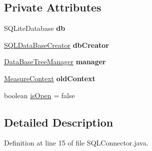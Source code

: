 \subsection*{Private Attributes}
\begin{DoxyCompactItemize}
\item 
\hypertarget{classcom_1_1qualoutdoor_1_1recorder_1_1persistent_1_1SQLConnector_aa90e660df93d5e81f841238868167bce}{S\-Q\-Lite\-Database {\bfseries db}}\label{classcom_1_1qualoutdoor_1_1recorder_1_1persistent_1_1SQLConnector_aa90e660df93d5e81f841238868167bce}

\item 
\hypertarget{classcom_1_1qualoutdoor_1_1recorder_1_1persistent_1_1SQLConnector_a78e2cb330cd0ce6e7d3b7805d1b50a01}{\hyperlink{classcom_1_1qualoutdoor_1_1recorder_1_1persistent_1_1SQLDataBaseCreator}{S\-Q\-L\-Data\-Base\-Creator} {\bfseries db\-Creator}}\label{classcom_1_1qualoutdoor_1_1recorder_1_1persistent_1_1SQLConnector_a78e2cb330cd0ce6e7d3b7805d1b50a01}

\item 
\hypertarget{classcom_1_1qualoutdoor_1_1recorder_1_1persistent_1_1SQLConnector_ab31ffde14c01c1fb07bc70adc02db978}{\hyperlink{classcom_1_1qualoutdoor_1_1recorder_1_1persistent_1_1DataBaseTreeManager}{Data\-Base\-Tree\-Manager} {\bfseries manager}}\label{classcom_1_1qualoutdoor_1_1recorder_1_1persistent_1_1SQLConnector_ab31ffde14c01c1fb07bc70adc02db978}

\item 
\hypertarget{classcom_1_1qualoutdoor_1_1recorder_1_1persistent_1_1SQLConnector_a992026f34b676a92c8604d33cea1c21c}{\hyperlink{classcom_1_1qualoutdoor_1_1recorder_1_1persistent_1_1MeasureContext}{Measure\-Context} {\bfseries old\-Context}}\label{classcom_1_1qualoutdoor_1_1recorder_1_1persistent_1_1SQLConnector_a992026f34b676a92c8604d33cea1c21c}

\item 
boolean \hyperlink{classcom_1_1qualoutdoor_1_1recorder_1_1persistent_1_1SQLConnector_a079c07058aa197f5a82f3a858eb3c728}{is\-Open} = false
\end{DoxyCompactItemize}


\subsection{Detailed Description}


Definition at line 15 of file S\-Q\-L\-Connector.\-java.




